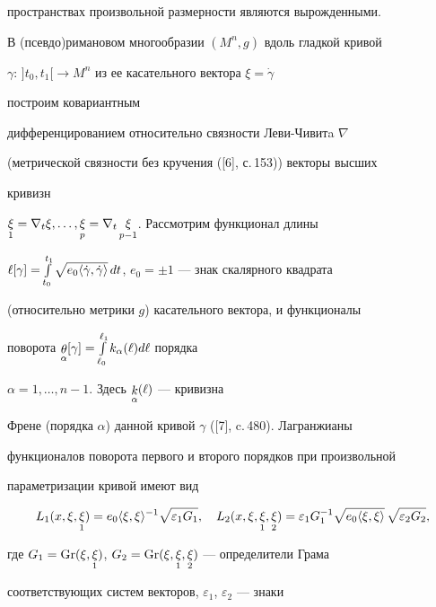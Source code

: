 пространствах произвольной размерности являются вырожденными. 


 


В (псевдо)римановом многообразии $(M^n,g)$ вдоль гладкой кривой 


$\gamma:\,]t_0,t_1[\to M^n$ из ее касательного вектора $\xi=\Dot\gamma$ 


построим ковариантным 


дифференцированием относительно связности Леви-Чивитa $\nabla$ 


(метрической связности без кручения ([6], с.\,153)) векторы высших 


кривизн 


$\mymath{\xi}_1=\nabla_t\xi,\dotsc,\mymath{\xi}_p=\nabla_t\mymath{\xi}_


{p-1}$. Рассмотрим функционал длины 


$\ell[\gamma]=\int\limits^{t_1}_{t_0}\sqrt{e_0\la\Dot\gamma, 


\Dot\gamma\ra}\,dt$, $e_0=\pm1$ --- знак скалярного квадрата 


(относительно метрики $g$) касательного вектора, и функционалы 


поворота $\mymath{\theta}_\alpha[\gamma]= 


\int\limits^{\ell_1}_{\ell_0}k_\alpha(\ell)d\ell$ порядка 


$\alpha=1,\dotsc,n-1$. Здесь $\mathop{k}\limits_\alpha(\ell)$ --- кривизна 


Френе (порядка $\alpha$) данной кривой $\gamma$ ([7], c.\,480). Лагранжианы 


функционалов поворота первого и второго порядков при произвольной 


параметризации кривой имеют вид 


$$ 


L_1(x,\xi,\mymath{\xi}_1)=e_0\la\xi,\xi\ra^{-1} 


\sqrt{\varepsilon_1G_1},\quad L_2(x,\xi,\mymath{\xi}_1, 


\mymath{\xi}_2)=\varepsilon_1G^{-1}_1 


\sqrt{e_0\la\xi,\xi\ra}\,\sqrt{\varepsilon_2G_2}, 


$$ 


где $G_1=\Gr(\xi,\mymath{\xi}_1)$, $G_2=\Gr(\xi, 


\mymath{\xi}_1,\mymath{\xi}_2)$ --- определители Грама 


соответствующих систем векторов, $\varepsilon_1$, $\varepsilon_2$ --- знаки 


